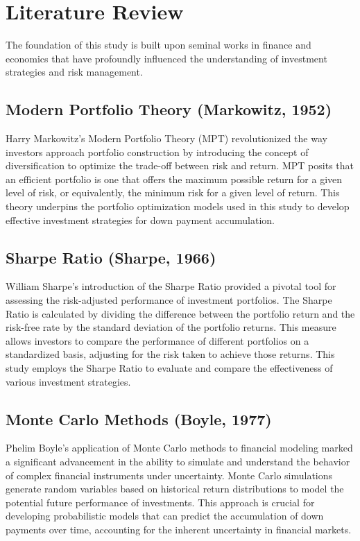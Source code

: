 \section{Literature Review}
The foundation of this study is built upon seminal works in finance and economics that have profoundly influenced the understanding of investment strategies and risk management.

\subsection{Modern Portfolio Theory (Markowitz, 1952)}
Harry Markowitz’s Modern Portfolio Theory (MPT) revolutionized the way investors approach portfolio construction by introducing the concept of diversification to optimize the trade-off between risk and return. MPT posits that an efficient portfolio is one that offers the maximum possible return for a given level of risk, or equivalently, the minimum risk for a given level of return. This theory underpins the portfolio optimization models used in this study to develop effective investment strategies for down payment accumulation.

\subsection{Sharpe Ratio (Sharpe, 1966)}
William Sharpe’s introduction of the Sharpe Ratio provided a pivotal tool for assessing the risk-adjusted performance of investment portfolios. The Sharpe Ratio is calculated by dividing the difference between the portfolio return and the risk-free rate by the standard deviation of the portfolio returns. This measure allows investors to compare the performance of different portfolios on a standardized basis, adjusting for the risk taken to achieve those returns. This study employs the Sharpe Ratio to evaluate and compare the effectiveness of various investment strategies.

\subsection{Monte Carlo Methods (Boyle, 1977)}
Phelim Boyle’s application of Monte Carlo methods to financial modeling marked a significant advancement in the ability to simulate and understand the behavior of complex financial instruments under uncertainty. Monte Carlo simulations generate random variables based on historical return distributions to model the potential future performance of investments. This approach is crucial for developing probabilistic models that can predict the accumulation of down payments over time, accounting for the inherent uncertainty in financial markets.

